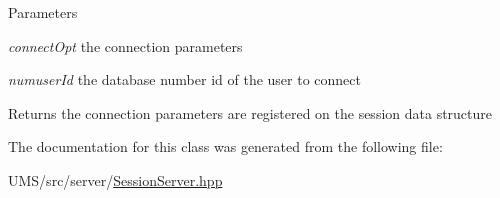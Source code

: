 \begin{DoxyParams}{Parameters}
\item[{\em connectOpt}]the connection parameters \item[{\em numuserId}]the database number id of the user to connect \end{DoxyParams}
\begin{DoxyReturn}{Returns}
the connection parameters are registered on the session data structure 
\end{DoxyReturn}


The documentation for this class was generated from the following file:\begin{DoxyCompactItemize}
\item 
UMS/src/server/\hyperlink{SessionServer_8hpp}{SessionServer.hpp}\end{DoxyCompactItemize}
